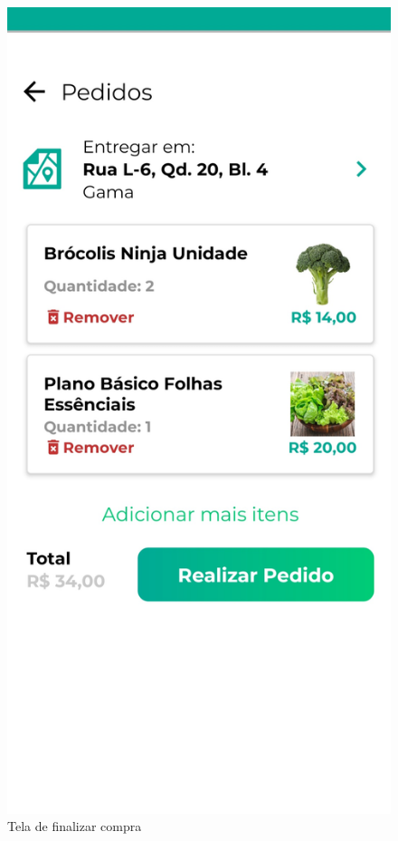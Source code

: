 \begin{figure}[h]
	\centering
	\includegraphics[keepaspectratio=true,scale=0.16]{figuras/finalizar_compra.jpg}
	\caption{Tela de finalizar compra}
        \label{tela-finalizar-compra-app}
\end{figure}

